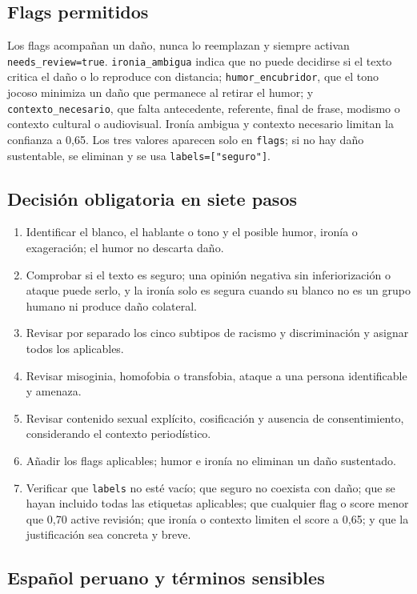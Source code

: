 \subsection*{Flags permitidos}

Los flags acompañan un daño, nunca lo reemplazan y siempre activan \texttt{needs\_review=true}. \texttt{ironia\_ambigua} indica que no puede decidirse si el texto critica el daño o lo reproduce con distancia; \texttt{humor\_encubridor}, que el tono jocoso minimiza un daño que permanece al retirar el humor; y \texttt{contexto\_necesario}, que falta antecedente, referente, final de frase, modismo o contexto cultural o audiovisual. Ironía ambigua y contexto necesario limitan la confianza a 0,65. Los tres valores aparecen solo en \texttt{flags}; si no hay daño sustentable, se eliminan y se usa \texttt{labels=["seguro"]}.

\subsection*{Decisión obligatoria en siete pasos}

\begin{enumerate}
\item Identificar el blanco, el hablante o tono y el posible humor, ironía o exageración; el humor no descarta daño.
\item Comprobar si el texto es seguro; una opinión negativa sin inferiorización o ataque puede serlo, y la ironía solo es segura cuando su blanco no es un grupo humano ni produce daño colateral.
\item Revisar por separado los cinco subtipos de racismo y discriminación y asignar todos los aplicables.
\item Revisar misoginia, homofobia o transfobia, ataque a una persona identificable y amenaza.
\item Revisar contenido sexual explícito, cosificación y ausencia de consentimiento, considerando el contexto periodístico.
\item Añadir los flags aplicables; humor e ironía no eliminan un daño sustentado.
\item Verificar que \texttt{labels} no esté vacío; que seguro no coexista con daño; que se hayan incluido todas las etiquetas aplicables; que cualquier flag o score menor que 0,70 active revisión; que ironía o contexto limiten el score a 0,65; y que la justificación sea concreta y breve.
\end{enumerate}

\subsection*{Español peruano y términos sensibles}

